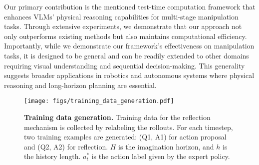Our primary contribution is the mentioned test-time computation framework that enhances VLMs' physical reasoning capabilities for multi-stage manipulation tasks. Through extensive experiments, we demonstrate that our approach not only outperforms existing methods but also maintains computational efficiency. Importantly, while we demonstrate our framework's effectiveness on manipulation tasks, it is designed to be general and can be readily extended to other domains requiring visual understanding and sequential decision-making. This generality suggests broader applications in robotics and autonomous systems where physical reasoning and long-horizon planning are essential.

\begin{figure*}[t!]
    \centering
    \texttt{[image: figs/training\_data\_generation.pdf]}
    \caption{\textbf{Training data generation.} Training data for the reflection mechanism is collected by relabeling the rollouts. For each timestep, two training examples are generated: (Q1, A1) for action proposal and (Q2, A2) for reflection. $H$ is the imagination horizon, and $h$ is the history length. $a_t^*$ is the action label given by the expert policy.}

    \label{fig:data_dollection}
\end{figure*}

